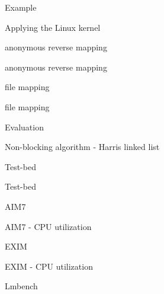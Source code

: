 \documentclass[english]{beamer} %
\begin{document}
\begin{frame}{Example}
\end{frame}

\begin{frame}{Applying the Linux kernel}
\end{frame}



\begin{frame}{anonymous reverse mapping}
\end{frame}


\begin{frame}{anonymous reverse mapping}
\end{frame}


\begin{frame}{file mapping}
\end{frame}


\begin{frame}{file mapping}
\end{frame}



\begin{frame}{Evaluation}
\end{frame}


\begin{frame}{Non-blocking algorithm - Harris linked list}
\end{frame}

\begin{frame}{Test-bed}
\end{frame}


\begin{frame}{Test-bed}
\end{frame}


\begin{frame}{AIM7}
\end{frame}



\begin{frame}{AIM7 - CPU utilization}
\end{frame}

\begin{frame}{EXIM}
\end{frame}


\begin{frame}{EXIM - CPU utilization}
\end{frame}


\begin{frame}{Lmbench}
\end{frame}
\end{document}
